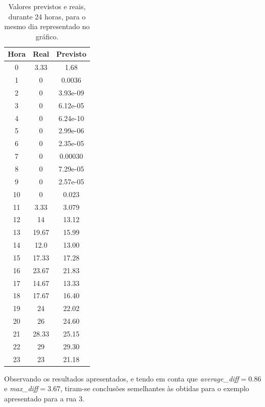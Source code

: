 \documentclass[a4paper, 12pt]{article}
\begin{document}
\begin{table}[H]
	\centering
	\begin{tabular}{||c||c|c||}
		\hline\hline
		Hora & Real&Previsto\\
		\hline\hline
		0 & 
3.33
 & 1.68\\
		\hline
		1  &
0 &0.0036 \\
		\hline
		2 & 0 & 	3.93e-09\\
		\hline
		3  & 0

 &  6.12e-05\\
		\hline
		4 & 0
 &6.24e-10 \\
		\hline
		5  &0 
 &2.99e-06 \\
		\hline
		6 & 0

 & 

2.35e-05 \\
		\hline
		7 & 0

 & 0.00030\\
		\hline
		8  &0
 & 7.29e-05\\
		\hline
		9 & 0 &  2.57e-05	\\
		\hline
		10 & 
0
 & 0.023 \\
		\hline
		11  &
3.33 &3.079 \\
		\hline
		12 & 14 & 13.12	\\
		\hline
		13  & 
19.67 
 &  15.99\\
		\hline
		14 & 
 12.0 &  13.00\\
		\hline
		15  & 17.33
 & 17.28\\
		\hline
		16 & 
23.67
 & 21.83

 \\
		\hline
		17 & 
14.67
 &13.33 \\
		\hline
		18  &
 17.67& 16.40\\
		\hline
		19 & 24 & 	22.02\\
		\hline
		20 & 
26
 & 24.60\\
		\hline
		21  &
 28.33& 25.15\\
		\hline
		22 & 29 & 29.30	\\
		\hline
		23  & 
23
 & 21.18\\
		\hline\hline
	\end{tabular}
\caption{Valores previstos e reais, durante 24 horas, para o mesmo dia representado no gráfico.}
\end{table}

Observando os resultados apresentados, e tendo em conta que \textit{average\_diff}$=0.86$ e \textit{max\_diff}$=3.67$, tiram-se conclusões semelhantes às obtidas para o exemplo apresentado para a rua $3$.
\end{document}
